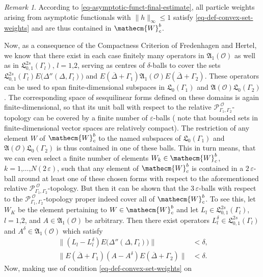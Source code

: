 \documentclass[11pt,twoside,openright]{report}
\theoremstyle{definition}
\theoremstyle{plain}
\theoremstyle{remark}
\newtheorem*{Rem}{Remark}
\theoremstyle{assumption}
\newcommand{\norm}[1]{\lVert #1 \rVert}
\newcommand{\bnorm}[1]{\bigl\lVert #1 \bigr\rVert}
\newcommand{\POG}{\mathcal{P}_{\Gamma_1 , \Gamma_2}^{\; \mathscr{O}}}
\newcommand{\Wecm}{\mathecm{W}}
\newcommand{\Lfrak}{\mathfrak{L}}
\newcommand{\EDdGl}{E \bigl( \Delta'' ( \Delta , \Gamma_l ) \bigr)}
\newcommand{\EDGoneplus}{E ( \overline{\Delta} + \Gamma_1)}
\newcommand{\EDGtwoplus}{E ( \overline{\Delta} + \Gamma_2)}
\newcommand{\AO}{\mathfrak{A} ( \mathscr{O} )}
\newcommand{\AoneO}{\mathfrak{A}_1 ( \mathscr{O} )}
\begin{document}
\begin{Rem}
  According to \eqref{eq-asymptotic-funct-final-estimate}, all
  particle weights arising from asymptotic functionals with
  $\norm{h}_\infty \leqslant 1$ satisfy
  \eqref{eq-def-convex-set-weights} and are thus contained in
  $\Wecm_c^b$.
\end{Rem}

Now, as a consequence of the Compactness Criterion of Fredenhagen and
Hertel, we know that there exist in each case finitely many operators
in $\AoneO$ as well as in $\Lfrak_{0 , 1}^{2 s} ( \Gamma_l )$, $l = 1
\text{,} 2$, serving as centres of $\delta$-balls to cover the sets
$\Lfrak_{0 , 1}^{2 s} ( \Gamma_l ) \EDdGl$ and $\EDGoneplus \AoneO
\EDGtwoplus$. These operators can be used to span finite-dimensional
subspaces in $\Lfrak_0 ( \Gamma_1 )$ and $\AO \Lfrak_0 ( \Gamma_2
)$. The corresponding space of sesquilinear forms defined on these
domains is again finite-dimensional, so that its unit ball with
respect to the relative $\POG$-topology can be covered by a finite
number of $\varepsilon$-balls ( note that bounded sets in
finite-dimensional vector spaces are relatively compact). The
restriction of any element $W$ of $\Wecm_c^b$ to the named subspaces
of $\Lfrak_0 ( \Gamma_1 )$ and $\AO \Lfrak_0 ( \Gamma_2 )$ is thus
contained in one of these balls. This in turn means, that we can even
select a finite number of elements $W_k \in \Wecm_c^b$, $k = 1
\text{,} \dots \text{,} N ( 2 \, \varepsilon )$, such that any element
of $\Wecm_c^b$ is contained in a $2 \, \varepsilon$-ball around at
least one of these chosen forms with respect to the aforementioned
relative $\POG$-topology. But then it can be shown that the $3 \,
\varepsilon$-balls with respect to the $\POG$-topology proper indeed
cover all of $\Wecm_c^b$. To see this, let $W_K$ be the element
pertaining to $W \in \Wecm_c^b$ and let $L_l \in \Lfrak_{0 , 1}^{2 s}
( \Gamma_l )$, $l = 1 \text{,} 2$, and $A \in \AoneO$ be
arbitrary. Then there exist operators $L_l^\delta \in \Lfrak_{0 ,
1}^{2 s} ( \Gamma_l )$ and $A^\delta \in \AoneO$ which satisfy
\begin{subequations}
  \label{eq-delta-estimates}
  \begin{align}
    \bnorm{( L_l - L_l^\delta ) \EDdGl} & < \delta \text{,} \\
    \bnorm{\EDGoneplus ( A - A^\delta ) \EDGtwoplus} & < \delta \text{.}
  \end{align}
\end{subequations}
Now, making use of condition \eqref{eq-def-convex-set-weights} on
\end{document}
